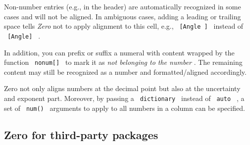 Non-number entries (e.g., in the header) are automatically recognized in
some cases and will not be aligned. In ambiguous cases, adding a leading
or trailing space tells \emph{Zero} not to apply alignment to this cell,
e.g., \texttt{\ {[}Angle\ {]}\ } instead of \texttt{\ {[}Angle{]}\ } .


In addition, you can prefix or suffix a numeral with content wrapped by
the function \texttt{\ nonum{[}{]}\ } to mark it as \emph{not belonging
to the number} . The remaining content may still be recognized as a
number and formatted/aligned accordingly.

\begin{Shaded}
\begin{Highlighting}[]
\NormalTok{  [12.111],}
\NormalTok{)}
\end{Highlighting}
\end{Shaded}


Zero not only aligns numbers at the decimal point but also at the
uncertainty and exponent part. Moreover, by passing a
\texttt{\ dictionary\ } instead of \texttt{\ auto\ } , a set of
\texttt{\ num()\ } arguments to apply to all numbers in a column can be
specified.

\begin{Shaded}
\begin{Highlighting}[]
\NormalTok{  [1], [3.45e2], [{-}11.1+{-}3], [0],}
\NormalTok{)}
\end{Highlighting}
\end{Shaded}


\subsection{Zero for third-party
packages}\label{zero-for-third-party-packages}

